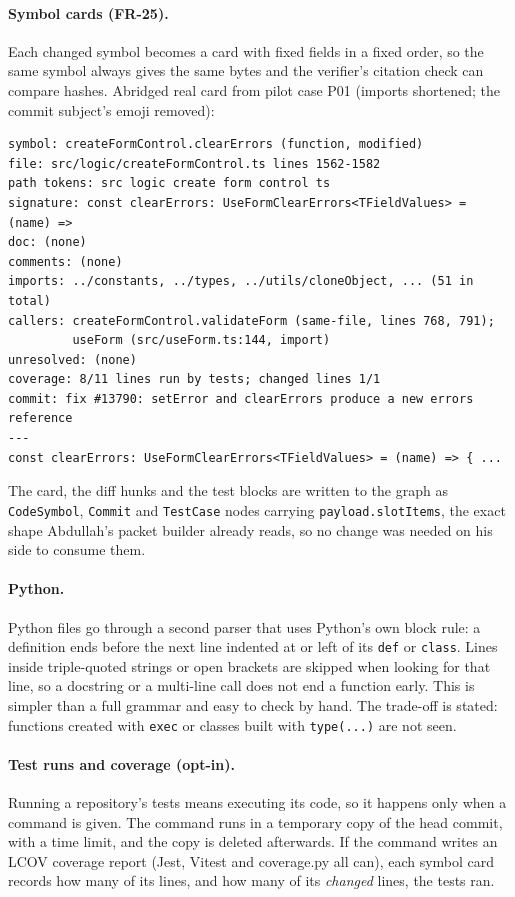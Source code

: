 \paragraph{Symbol cards (FR-25).} Each changed symbol becomes a card with
fixed fields in a fixed order, so the same symbol always gives the same bytes
and the verifier's citation check can compare hashes. Abridged real card from
pilot case P01 (imports shortened; the commit subject's emoji removed):
{\small
\begin{verbatim}
symbol: createFormControl.clearErrors (function, modified)
file: src/logic/createFormControl.ts lines 1562-1582
path tokens: src logic create form control ts
signature: const clearErrors: UseFormClearErrors<TFieldValues> = (name) =>
doc: (none)
comments: (none)
imports: ../constants, ../types, ../utils/cloneObject, ... (51 in total)
callers: createFormControl.validateForm (same-file, lines 768, 791);
         useForm (src/useForm.ts:144, import)
unresolved: (none)
coverage: 8/11 lines run by tests; changed lines 1/1
commit: fix #13790: setError and clearErrors produce a new errors reference
---
const clearErrors: UseFormClearErrors<TFieldValues> = (name) => { ...
\end{verbatim}
}
\noindent The card, the diff hunks and the test blocks are written to the
graph as \texttt{CodeSymbol}, \texttt{Commit} and \texttt{TestCase} nodes
carrying \texttt{payload.slotItems}, the exact shape Abdullah's packet builder
already reads, so no change was needed on his side to consume them.

\paragraph{Python.} Python files go through a second parser that uses
Python's own block rule: a definition ends before the next line indented at or
left of its \texttt{def} or \texttt{class}. Lines inside triple-quoted strings
or open brackets are skipped when looking for that line, so a docstring or a
multi-line call does not end a function early. This is simpler than a full
grammar and easy to check by hand. The trade-off is stated: functions created
with \texttt{exec} or classes built with \texttt{type(...)} are not seen.

\paragraph{Test runs and coverage (opt-in).} Running a repository's tests
means executing its code, so it happens only when a command is given. The
command runs in a temporary copy of the head commit, with a time limit, and
the copy is deleted afterwards. If the command writes an LCOV coverage report
(Jest, Vitest and coverage.py all can), each symbol card records how many of
its lines, and how many of its \emph{changed} lines, the tests ran.

